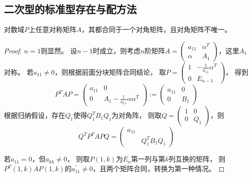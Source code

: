 \subsection{二次型的标准型存在与配方法}

\begin{theorem}[二次型标准型的存在性]
  对数域$P$上任意对称矩阵$A$，其都合同于一个对角矩阵，且对角矩阵不唯一。
\end{theorem}

\begin{proof}
  $n = 1$则显然。
  设$n - 1$时成立，则考虑$n$阶矩阵$A = \left(
    \begin{array}{cc}
      a_{11}&\alpha^T\\
      \alpha & A_1
    \end{array}
  \right)$，这里$A_1$对称。
  若$a_{11} \neq 0$，则根据前面分块矩阵合同结论，
  取$P = \left(
    \begin{array}{cc}
      1&- \frac{1}{a_{11}}\alpha^T\\
      0&E_{n-1}
    \end{array}
  \right)$，
  得到
  \begin{equation*}
    P^TAP = \left(
      \begin{array}{cc}
        a_{11}&0\\
        0&A_1 - \frac{1}{a_{11}}\alpha\alpha^T
      \end{array}
    \right) := \left(
      \begin{array}{cc}
        a_{11}&0\\
        0&B_1
      \end{array}
    \right)
  \end{equation*}
  根据归纳假设，存在$Q_1$使得$Q_1^TB_1Q_1$为对角阵，
  则取$Q = \left(
    \begin{array}{cc}
      1&0\\
      0&Q_1
    \end{array}
  \right)$，则
  \begin{equation*}
    Q^TP^T APQ = \left(
      \begin{array}{cc}
        a_{11}&\\
        &Q_1^TB_1Q_1
      \end{array}
    \right)
  \end{equation*}

  若$a_{11} = 0$，但$a_{kk} \neq 0$，
  则取$P(1,k)$为$E_n$第一列与第$k$列互换的矩阵，
  则$P^T(1,k)AP(1,k)$的$a^{\prime}_{11} \neq 0$，且两个矩阵合同，转换为第一种情况。


\end{proof}

